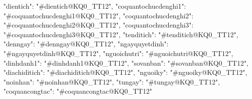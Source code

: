 {"dientich": "#dientich@KQ0_TT12",
                "coquantochucdenghi1": "#coquantochucdenghi1@KQ0_TT12",
                "coquantochucdenghi2": "#coquantochucdenghi2@KQ0_TT12",
                "coquantochucdenghi3": "#coquantochucdenghi3@KQ0_TT12",
                "tenditich": "#tenditich@KQ0_TT12",
                "denngay": "#denngay@KQ0_TT12",
                "ngayquyetdinh": "#ngayquyetdinh@KQ0_TT12",
                "nguoichutri": "#nguoichutri@KQ0_TT12",
                "dinhdanh1": "#dinhdanh1@KQ0_TT12",
                "sovanban": "#sovanban@KQ0_TT12",
                "diachiditich": "#diachiditich@KQ0_TT12",
                "nguoiky": "#nguoiky@KQ0_TT12",
                "noinhan": "#noinhan@KQ0_TT12",
                "tungay": "#tungay@KQ0_TT12",
                "coquancongtac": "#coquancongtac@KQ0_TT12"}